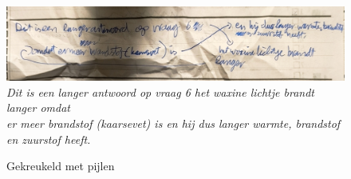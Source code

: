 \documentclass[12pt]{article}
\begin{document}
\begin{multicols}{2}
\begin{figure}[H]
    \label{fig:img-short-unreadable-arrow}
\end{figure}
\begin{figure}[H]
    \centering
    \includegraphics[width=1\linewidth]{./images/methoden/inscannen/tekst/gekreukeld_met_pijlen.png}
    \textit{Dit is een langer antwoord op vraag 6 het waxine lichtje brandt langer omdat \\
er meer brandstof (kaarsevet) is en hij dus langer warmte, brandstof en zuurstof heeft.}
    \caption{Gekreukeld met pijlen}
    \label{fig:img-wrinkeled-arrow}
\end{figure}

\end{multicols}
\pagebreak
\end{document}

